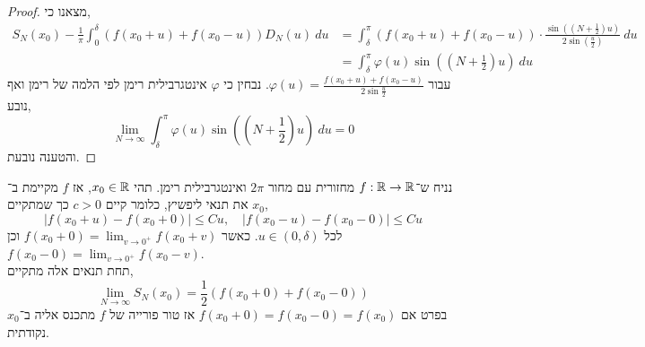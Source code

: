 \begin{proof}
	מצאנו כי,
	\begin{align*}
		S_N(x_0) - \frac{1}{\pi} \int_{0}^{\delta} (f(x_0 + u) + f(x_0 - u)) D_N(u)\ du
		& = \int_{\delta}^{\pi} (f(x_0 + u) + f(x_0 - u)) \cdot \frac{\sin((N + \frac{1}{2}) u)}{2 \sin(\frac{u}{2})}\ du \\
		& = \int_{\delta}^{\pi} \varphi(u) \sin((N + \frac{1}{2}) u)\ du
	\end{align*}
	עבור $\varphi(u) = \frac{f(x_0 + u) + f(x_0 - u)}{2 \sin \frac{u}{2}}$.
	נבחין כי $\varphi$ אינטגרבילית רימן לפי הלמה של רימן ואף נובע,
	\[
		\lim_{N \to \infty} \int_{\delta}^{\pi} \varphi(u) \sin((N + \frac{1}{2}) u)\ du
		= 0
	\]
	והטענה נובעת.
\end{proof}
\begin{theorem}
	נניח ש־$f : \mathbb{R} \to \mathbb{R}$ מחזורית עם מחור $2 \pi$ ואינטגרבילית רימן.
	תהי $x_0 \in \mathbb{R}$, אז $f$ מקיימת ב־$x_0$ את תנאי ליפשיץ,
	כלומר קיים $c > 0$ כך שמתקיים,
	\[
		|f(x_0 + u) - f(x_0 + 0)| \le C u,
		\quad
		|f(x_0 - u) - f(x_0 - 0)| \le C u
	\]
	לכל $u \in (0, \delta)$.
	כאשר $f(x_0 + 0) = \lim_{v \to 0^+} f(x_0 + v)$ וכן $f(x_0 - 0) = \lim_{v \to 0^+} f(x_0 - v)$. \\
	תחת תנאים אלה מתקיים,
	\[
		\lim_{N \to \infty} S_N(x_0)
		= \frac{1}{2}(f(x_0 + 0) + f(x_0 - 0))
	\]
	בפרט אם $f(x_0 + 0) = f(x_0 - 0) = f(x_0)$ אז טור פורייה של $f$ מתכנס אליה ב־$x_0$ נקודתית.
\end{theorem}
